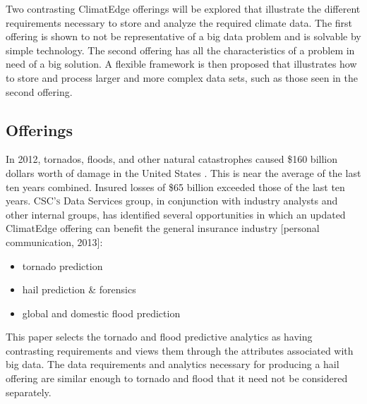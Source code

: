 Two contrasting ClimatEdge\texttrademark{} offerings will be explored that illustrate the different requirements necessary to store and analyze the required climate data. The first offering is shown to not be representative of a big data problem and is solvable by simple technology. The second offering has all the characteristics of a problem in need of a big solution. A flexible framework is then proposed that illustrates how to store and process larger and more complex data sets, such as those seen in the second offering.
\subsection{Offerings}
In 2012, tornados, floods, and other natural catastrophes caused \$160  billion dollars worth of damage in the United States \cite{stalder}. This is near the average of the last ten years combined. Insured losses of \$65 billion exceeded those of the last ten years. \textsc{CSC's} Data Services group, in conjunction with industry analysts and other internal groups, has identified several opportunities  in which an updated ClimatEdge\texttrademark{} offering can benefit the general insurance industry [personal communication, 2013]:
\begin{itemize}
    \item tornado prediction
    \item hail prediction \& forensics
    \item global and domestic flood prediction
\end{itemize}
This paper selects the tornado and flood predictive analytics as having contrasting requirements and views them through the attributes associated with big data. The data requirements and analytics necessary for producing a hail offering are similar enough to tornado and flood that it need not be considered separately.